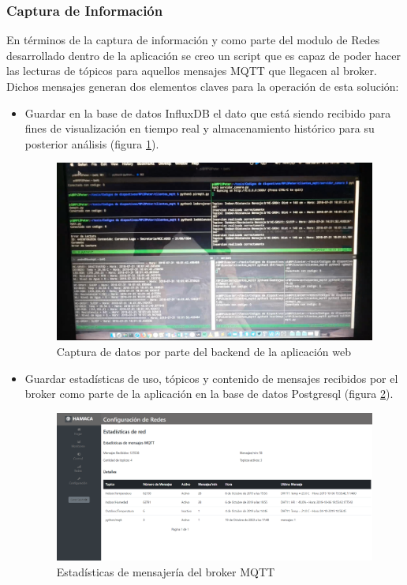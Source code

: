 \subsubsection{Captura de Información}
En términos de la captura de información y como parte del modulo de Redes desarrollado dentro de la aplicación se creo un script que es capaz de poder hacer las lecturas de tópicos para aquellos mensajes MQTT que llegacen al broker. Dichos mensajes generan dos elementos claves para la operación de esta solución:
\begin{itemize}
\item Guardar en la base de datos InfluxDB el dato que está siendo recibido para fines de visualización en tiempo real y almacenamiento histórico para su posterior análisis (figura \ref{fig:captura_data}).
\begin{figure}[htb]
\centering
\includegraphics[scale=0.18]{./Figuras/captura_data.png}
\caption{Captura de datos por parte del backend de la aplicación web}
\label{fig:captura_data}
\vspace*{-10pt}
\end{figure}

\item Guardar estadísticas de uso, tópicos y contenido de mensajes recibidos por el broker como parte de la aplicación en la base de datos Postgresql (figura \ref{fig:app_red}).
\begin{figure}[htb]
\centering
\includegraphics[scale=0.2]{./Figuras/hamaca_redes.png}
\caption{Estadísticas de mensajería del broker MQTT}
\label{fig:app_red}
\vspace*{-10pt}
\end{figure}
\end{itemize} 

